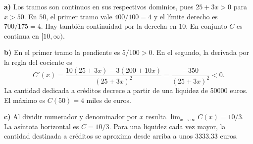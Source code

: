 \textbf{a)} Los tramos son continuos en sus respectivos
dominios, pues $25+3x>0$ para $x>50$. En $50$, el primer
tramo vale $400/100=4$ y el límite derecho es $700/175=4$.
Hay también continuidad por la derecha en $10$. En conjunto
$C$ es continua en $[10,\infty)$.

\textbf{b)} En el primer tramo la pendiente es $5/100>0$.
En el segundo, la derivada por la regla del cociente es
\[
C'(x)=\frac{10(25+3x)-3(200+10x)}{(25+3x)^2}
=\frac{-350}{(25+3x)^2}<0.
\]
La cantidad dedicada a créditos decrece a partir de una liquidez
de 50000 euros. El máximo es $C(50)=4$ miles de euros.

\textbf{c)} Al dividir numerador y denominador por $x$ resulta
$\lim_{x\to\infty}C(x)=10/3$. La asíntota horizontal es $C=10/3$.
Para una liquidez cada vez mayor, la cantidad destinada a créditos
se aproxima desde arriba a unos 3333.33 euros.
